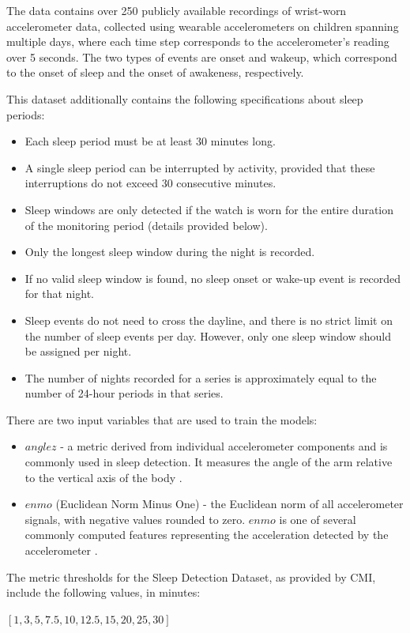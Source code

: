 \documentclass{article}
\begin{document}
The data contains over 250 publicly available recordings of wrist-worn accelerometer data, collected using wearable accelerometers on children spanning multiple days, where each time step corresponds to the accelerometer’s reading over 5 seconds. The two types of events are onset and wakeup, which correspond to the onset of sleep and the onset of awakeness, respectively. 

This dataset additionally contains the following specifications about sleep periods:
\begin{itemize}
  \item Each sleep period must be at least 30 minutes long.
  \item A single sleep period can be interrupted by activity, provided that these interruptions do not exceed 30 consecutive minutes.
  \item Sleep windows are only detected if the watch is worn for the entire duration of the monitoring period (details provided below).
  \item Only the longest sleep window during the night is recorded.
  \item If no valid sleep window is found, no sleep onset or wake-up event is recorded for that night.
  \item Sleep events do not need to cross the dayline, and there is no strict limit on the number of sleep events per day. However, only one sleep window should be assigned per night.
  \item The number of nights recorded for a series is approximately equal to the number of 24-hour periods in that series.
\end{itemize} 
There are two input variables that are used to train the models:
\begin{itemize}
  \item $anglez$ - a metric derived from individual accelerometer components and is commonly used in sleep detection. It measures the angle of the arm relative to the vertical axis of the body \citep{migueles2019}.
  \item $enmo$ (Euclidean Norm Minus One) - the Euclidean norm of all accelerometer signals, with negative values rounded to zero. $enmo$ is one of several commonly computed features representing the acceleration detected by the accelerometer \citep{migueles2019}.
\end{itemize} 

The metric thresholds for the Sleep Detection Dataset, as provided by CMI, include the following values, in minutes:
 \begin{center} $[1, 3, 5, 7.5, 10, 12.5, 15, 20, 25, 30]$ \end{center}
\end{document}
